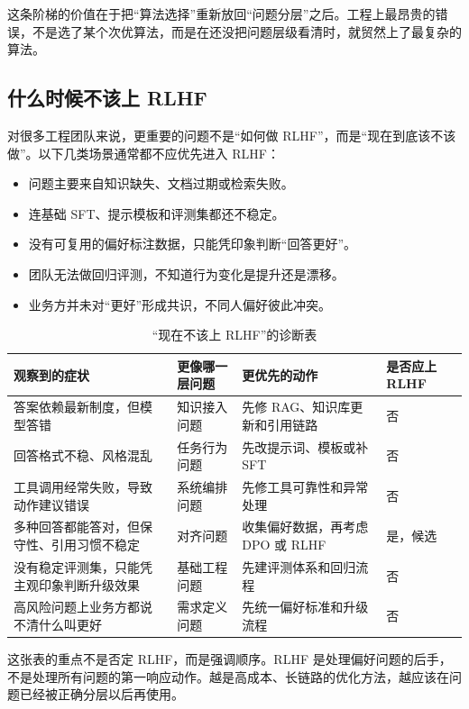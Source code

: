 这条阶梯的价值在于把“算法选择”重新放回“问题分层”之后。工程上最昂贵的错误，不是选了某个次优算法，而是在还没把问题层级看清时，就贸然上了最复杂的算法。

\subsection{什么时候不该上 RLHF}
对很多工程团队来说，更重要的问题不是“如何做 RLHF”，而是“现在到底该不该做”。以下几类场景通常都不应优先进入 RLHF：
\begin{itemize}
  \item 问题主要来自知识缺失、文档过期或检索失败。
  \item 连基础 SFT、提示模板和评测集都还不稳定。
  \item 没有可复用的偏好标注数据，只能凭印象判断“回答更好”。
  \item 团队无法做回归评测，不知道行为变化是提升还是漂移。
  \item 业务方并未对“更好”形成共识，不同人偏好彼此冲突。
\end{itemize}

\begin{table}[H]
\centering
\small
\begin{tabularx}{\textwidth}{>{\raggedright\arraybackslash}p{3.1cm}>{\raggedright\arraybackslash}p{2.8cm}>{\raggedright\arraybackslash}p{3.1cm}>{\raggedright\arraybackslash}X}
\toprule
\textbf{观察到的症状} & \textbf{更像哪一层问题} & \textbf{更优先的动作} & \textbf{是否应上 RLHF} \\
\midrule
答案依赖最新制度，但模型答错 & 知识接入问题 & 先修 RAG、知识库更新和引用链路 & 否 \\
回答格式不稳、风格混乱 & 任务行为问题 & 先改提示词、模板或补 SFT & 否 \\
工具调用经常失败，导致动作建议错误 & 系统编排问题 & 先修工具可靠性和异常处理 & 否 \\
多种回答都能答对，但保守性、引用习惯不稳定 & 对齐问题 & 收集偏好数据，再考虑 DPO 或 RLHF & 是，候选 \\
没有稳定评测集，只能凭主观印象判断升级效果 & 基础工程问题 & 先建评测体系和回归流程 & 否 \\
高风险问题上业务方都说不清什么叫更好 & 需求定义问题 & 先统一偏好标准和升级流程 & 否 \\
\bottomrule
\end{tabularx}
\caption{“现在不该上 RLHF”的诊断表}
\label{tab:when-not-rlhf}
\end{table}

这张表的重点不是否定 RLHF，而是强调顺序。RLHF 是处理偏好问题的后手，不是处理所有问题的第一响应动作。越是高成本、长链路的优化方法，越应该在问题已经被正确分层以后再使用。

